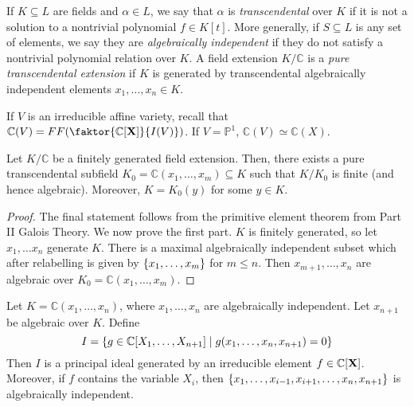 If \( K \subseteq L \) are fields and \( \alpha \in L \), we say that \( \alpha \) is \emph{transcendental} over \( K \) if it is not a solution to a nontrivial polynomial \( f \in K[t] \).
More generally, if \( S \subseteq L \) is any set of elements, we say they are \emph{algebraically independent} if they do not satisfy a nontrivial polynomial relation over \( K \).
A field extension \( K / \mathbb C \) is a \emph{pure transcendental extension} if \( K \) is generated by transcendental algebraically independent elements \( x_1, \dots, x_n \in K \).

If \( V \) is an irreducible affine variety, recall that \( \mathbb C(V) = FF\qty(\faktor{\mathbb C[\vb X]}{I(V)}) \).
If \( V = \mathbb P^1 \), \( \mathbb C(V) \simeq \mathbb C(X) \).

\begin{proposition}
    Let \( K / \mathbb C \) be a finitely generated field extension.
    Then, there exists a pure transcendental subfield \( K_0 = \mathbb C(x_1, \dots, x_m) \subseteq K \) such that \( K / K_0 \) is finite (and hence algebraic).
    Moreover, \( K = K_0(y) \) for some \( y \in K \).
\end{proposition}
\begin{proof}
    The final statement follows from the primitive element theorem from Part II Galois Theory.
    We now prove the first part.
    \( K \) is finitely generated, so let \( x_1, \dots x_n \) generate \( K \).
    There is a maximal algebraically independent subset which after relabelling is given by \( \qty{x_1, \dots, x_m} \) for \( m \leq n \).
    Then \( x_{m+1}, \dots, x_n \) are algebraic over \( K_0 = \mathbb C(x_1, \dots, x_m) \).
\end{proof}
\begin{proposition}
    Let \( K = \mathbb C(x_1, \dots, x_n) \), where \( x_1, \dots, x_n \) are algebraically independent.
    Let \( x_{n+1} \) be algebraic over \( K \).
    Define
    \[ I = \qty{g \in \mathbb C[X_1, \dots, X_{n+1}] \mid g(x_1, \dots, x_n, x_{n+1}) = 0} \]
    Then \( I \) is a principal ideal generated by an irreducible element \( f \in \mathbb C[\vb X] \).
    Moreover, if \( f \) contains the variable \( X_i \), then \( \qty{x_1, \dots, x_{i-1}, x_{i+1}, \dots, x_n, x_{n+1}} \) is algebraically independent.
\end{proposition}
